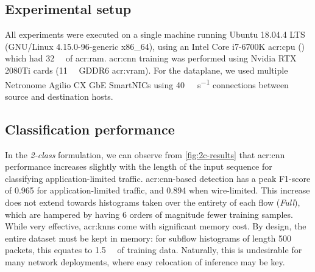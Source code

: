 \subsection{Experimental setup}
All experiments were executed on a single machine running Ubuntu 18.04.4 LTS (GNU/Linux 4.15.0-96-generic x86\_64), using an Intel Core i7-6700K \gls{acr:cpu} () which had \SI{32}{\gibi\byte} of \gls{acr:ram}.
\gls{acr:cnn} training was performed using Nvidia RTX 2080Ti cards (\qty{11}{\giga\byte} GDDR6 \gls{acr:vram}).
For the dataplane, we used multiple Netronome Agilio CX GbE SmartNICs using \qty{40}{\giga\bit\per\second} connections between source and destination hosts.


\subsection{Classification performance}
In the \emph{2-class} formulation, we can observe from \cref{fig:2c-results} that \gls{acr:cnn} performance increases slightly with the length of the input sequence for classifying application-limited traffic.
\gls{acr:cnn}-based detection has a peak F1-score of \num{0.965} for application-limited traffic, and \num{0.894} when wire-limited.
This increase does not extend towards histograms taken over the entirety of each flow (\emph{Full}), which are hampered by having 6 orders of magnitude fewer training samples.
While very effective, \glspl{acr:knn} come with significant memory cost.
By design, the entire dataset must be kept in memory: for subflow histograms of length \num{500} packets, this equates to \qty{1.5}{\gibi\byte} of training data.
Naturally, this is undesirable for many network deployments, where easy relocation of inference may be key.

